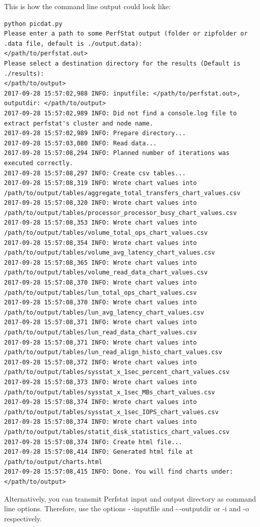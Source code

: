 \documentclass[8pt]{extarticle}
\begin{document}
This is how the command line output could look like:
\begin{lstlisting}
python picdat.py
Please enter a path to some PerfStat output (folder or zipfolder or .data file, default is ./output.data):
</path/to/perfstat.out>
Please select a destination directory for the results (Default is ./results):
</path/to/output>
2017-09-28 15:57:02,988 INFO: inputfile: </path/to/perfstat.out>, outputdir: </path/to/output>
2017-09-28 15:57:02,989 INFO: Did not find a console.log file to extract perfstat's cluster and node name.
2017-09-28 15:57:02,989 INFO: Prepare directory...
2017-09-28 15:57:03,080 INFO: Read data...
2017-09-28 15:57:08,294 INFO: Planned number of iterations was executed correctly.
2017-09-28 15:57:08,297 INFO: Create csv tables...
2017-09-28 15:57:08,319 INFO: Wrote chart values into /path/to/output/tables/aggregate_total_transfers_chart_values.csv
2017-09-28 15:57:08,320 INFO: Wrote chart values into /path/to/output/tables/processor_processor_busy_chart_values.csv
2017-09-28 15:57:08,353 INFO: Wrote chart values into /path/to/output/tables/volume_total_ops_chart_values.csv
2017-09-28 15:57:08,354 INFO: Wrote chart values into /path/to/output/tables/volume_avg_latency_chart_values.csv
2017-09-28 15:57:08,365 INFO: Wrote chart values into /path/to/output/tables/volume_read_data_chart_values.csv
2017-09-28 15:57:08,370 INFO: Wrote chart values into /path/to/output/tables/lun_total_ops_chart_values.csv
2017-09-28 15:57:08,370 INFO: Wrote chart values into /path/to/output/tables/lun_avg_latency_chart_values.csv
2017-09-28 15:57:08,371 INFO: Wrote chart values into /path/to/output/tables/lun_read_data_chart_values.csv
2017-09-28 15:57:08,371 INFO: Wrote chart values into /path/to/output/tables/lun_read_align_histo_chart_values.csv
2017-09-28 15:57:08,372 INFO: Wrote chart values into /path/to/output/tables/sysstat_x_1sec_percent_chart_values.csv
2017-09-28 15:57:08,373 INFO: Wrote chart values into /path/to/output/tables/sysstat_x_1sec_MBs_chart_values.csv
2017-09-28 15:57:08,374 INFO: Wrote chart values into /path/to/output/tables/sysstat_x_1sec_IOPS_chart_values.csv
2017-09-28 15:57:08,374 INFO: Wrote chart values into /path/to/output/tables/statit_disk_statistics_chart_values.csv
2017-09-28 15:57:08,374 INFO: Create html file...
2017-09-28 15:57:08,414 INFO: Generated html file at /path/to/output/charts.html
2017-09-28 15:57:08,415 INFO: Done. You will find charts under: </path/to/output>
\end{lstlisting}

Alternatively, you can transmit Perfstat input and output directory as command line options. Therefore, use the options -\,-inputfile and -\,-outputdir or -i and -o respectively.
\end{document}
